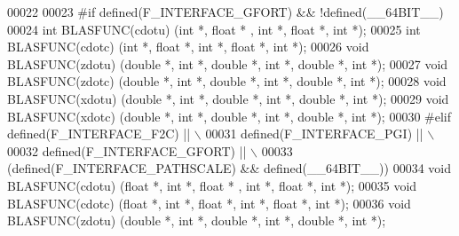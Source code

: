 \begin{DoxyCode}
00022 
00023 \textcolor{preprocessor}{#if defined(F\_INTERFACE\_GFORT) && !defined(\_\_64BIT\_\_)}
00024 \textcolor{keywordtype}{int}   BLASFUNC(cdotu)  (\textcolor{keywordtype}{int} *, \textcolor{keywordtype}{float}  * , \textcolor{keywordtype}{int} *, \textcolor{keywordtype}{float}  *,  \textcolor{keywordtype}{int} *);
00025 \textcolor{keywordtype}{int}   BLASFUNC(cdotc)  (\textcolor{keywordtype}{int} *, \textcolor{keywordtype}{float}  *,  \textcolor{keywordtype}{int} *, \textcolor{keywordtype}{float}  *,  \textcolor{keywordtype}{int} *);
00026 \textcolor{keywordtype}{void}  BLASFUNC(zdotu)  (\textcolor{keywordtype}{double} *, \textcolor{keywordtype}{int} *, \textcolor{keywordtype}{double}  *, \textcolor{keywordtype}{int} *, \textcolor{keywordtype}{double}  *, \textcolor{keywordtype}{int} *);
00027 \textcolor{keywordtype}{void}  BLASFUNC(zdotc)  (\textcolor{keywordtype}{double} *, \textcolor{keywordtype}{int} *, \textcolor{keywordtype}{double}  *, \textcolor{keywordtype}{int} *, \textcolor{keywordtype}{double}  *, \textcolor{keywordtype}{int} *);
00028 \textcolor{keywordtype}{void}  BLASFUNC(xdotu)  (\textcolor{keywordtype}{double} *, \textcolor{keywordtype}{int} *, \textcolor{keywordtype}{double}  *, \textcolor{keywordtype}{int} *, \textcolor{keywordtype}{double}  *, \textcolor{keywordtype}{int} *);
00029 \textcolor{keywordtype}{void}  BLASFUNC(xdotc)  (\textcolor{keywordtype}{double} *, \textcolor{keywordtype}{int} *, \textcolor{keywordtype}{double}  *, \textcolor{keywordtype}{int} *, \textcolor{keywordtype}{double}  *, \textcolor{keywordtype}{int} *);
00030 \textcolor{preprocessor}{#elif  defined(F\_INTERFACE\_F2C) || \(\backslash\)}
00031 \textcolor{preprocessor}{     defined(F\_INTERFACE\_PGI) || \(\backslash\)}
00032 \textcolor{preprocessor}{     defined(F\_INTERFACE\_GFORT) || \(\backslash\)}
00033 \textcolor{preprocessor}{    (defined(F\_INTERFACE\_PATHSCALE) && defined(\_\_64BIT\_\_))}
00034 \textcolor{keywordtype}{void}  BLASFUNC(cdotu)  (\textcolor{keywordtype}{float} *,  \textcolor{keywordtype}{int} *, \textcolor{keywordtype}{float}  * , \textcolor{keywordtype}{int} *, \textcolor{keywordtype}{float}  *,  \textcolor{keywordtype}{int} *);
00035 \textcolor{keywordtype}{void}  BLASFUNC(cdotc)  (\textcolor{keywordtype}{float} *,  \textcolor{keywordtype}{int} *, \textcolor{keywordtype}{float}  *,  \textcolor{keywordtype}{int} *, \textcolor{keywordtype}{float}  *,  \textcolor{keywordtype}{int} *);
00036 \textcolor{keywordtype}{void}  BLASFUNC(zdotu)  (\textcolor{keywordtype}{double} *, \textcolor{keywordtype}{int} *, \textcolor{keywordtype}{double}  *, \textcolor{keywordtype}{int} *, \textcolor{keywordtype}{double}  *, \textcolor{keywordtype}{int} *);

\end{DoxyCode}
